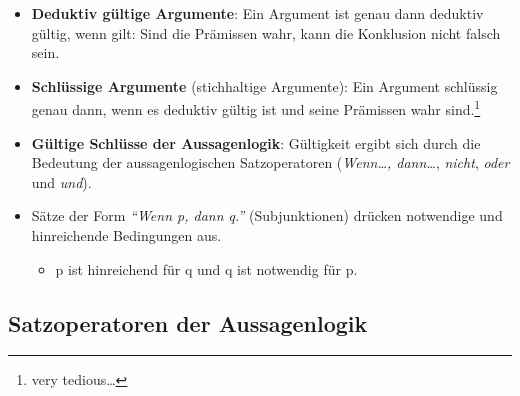 \documentclass[
  english,
  a4paper,
]{article}
\providecommand{\tightlist}{%
  \setlength{\itemsep}{0pt}\setlength{\parskip}{0pt}}
\begin{document}
\begin{itemize}
\tightlist
\item
  \textbf{Deduktiv gültige Argumente}: Ein Argument ist genau dann
  deduktiv gültig, wenn gilt: Sind die Prämissen wahr, kann die
  Konklusion nicht falsch sein.
\item
  \textbf{Schlüssige Argumente} (stichhaltige Argumente): Ein Argument
  schlüssig genau dann, wenn es deduktiv gültig ist und seine Prämissen
  wahr sind.\footnote{very tedious\ldots{}}
\item
  \textbf{Gültige Schlüsse der Aussagenlogik}: Gültigkeit ergibt sich
  durch die Bedeutung der aussagenlogischen Satzoperatoren
  (\emph{Wenn\ldots, dann\ldots{}}, \emph{nicht}, \emph{oder} und
  \emph{und}).
\item
  Sätze der Form \emph{``Wenn p, dann q.''} (Subjunktionen) drücken
  notwendige und hinreichende Bedingungen aus.

  \begin{itemize}
  \tightlist
  \item
    p ist hinreichend für q und q ist notwendig für p.
  \end{itemize}
\end{itemize}

\subsection{Satzoperatoren der
Aussagenlogik}\label{satzoperatoren-der-aussagenlogik}
\end{document}
